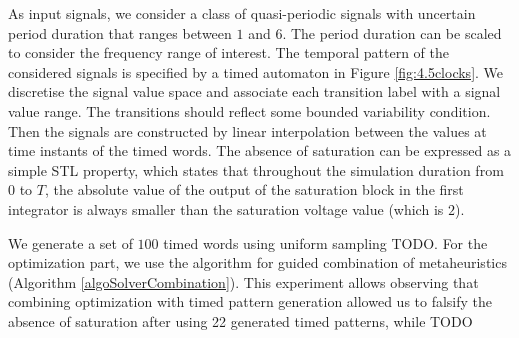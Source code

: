 As input signals, we consider a class of quasi-periodic signals with uncertain period duration that ranges between $1$ and $6$. The period duration can be scaled to consider the frequency range of interest. The temporal pattern of the considered signals is specified by a timed automaton in Figure \ref{fig:4.5clocks}. We discretise the signal value space and associate each transition label with a signal value range. The transitions should reflect some bounded variability condition. Then the signals are constructed by linear interpolation between the values at time instants of the timed words. The absence of saturation can be expressed as a simple STL property, which states that throughout the simulation duration from $0$ to $T$, the absolute value of the output of the saturation block in the first integrator is always smaller than the saturation voltage value (which is $2$).

We generate a set of $100$ timed words using uniform sampling \cite{} {\color{red}TODO}. For the optimization part, we use the algorithm for guided  combination of metaheuristics (Algorithm \ref{algoSolverCombination}). 
This experiment allows observing that combining optimization with timed pattern generation allowed us to falsify the absence of saturation after using 22 generated timed patterns, while {\color{red}TODO}